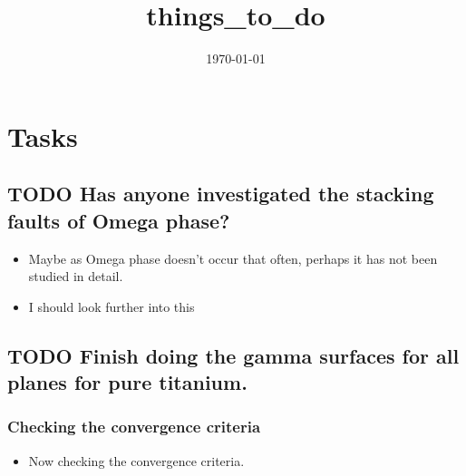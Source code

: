 \documentclass[11pt]{article}
\date{\today}
\title{things\_to\_do}
\begin{document}
\maketitle
\tableofcontents




\section{Tasks}
\label{sec-1}

\subsection{{\bfseries\sffamily TODO} Has anyone investigated the stacking faults of Omega phase?}
\label{sec-1-1}
\begin{itemize}
\item Maybe as Omega phase doesn't occur that often, perhaps it has not been
studied in detail.
\item I should look further into this
\end{itemize}
\subsection{{\bfseries\sffamily TODO} Finish doing the gamma surfaces for all planes for pure titanium.}
\label{sec-1-2}
\subsubsection{Checking the convergence criteria}
\label{sec-1-2-1}
\begin{itemize}
\item Now checking the convergence criteria.
\end{itemize}
\end{document}
